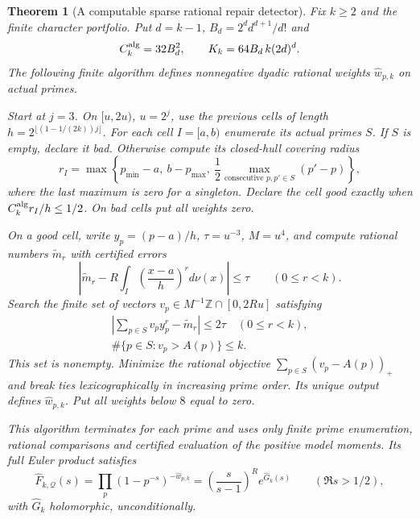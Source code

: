 \documentclass[11pt]{article}
\newtheorem{theorem}{Theorem}[section]
\theoremstyle{definition}
\begin{document}
\begin{theorem}[A computable sparse rational repair detector]
\label{thm:computable-rational-repair-detector}
Fix $k\ge2$ and the finite character portfolio. Put
$d=k-1$, $B_d=2^d d^{d+1}/d!$ and
\[
 C_k^{\rm alg}=32B_d^2,\qquad
 K_k=64B_d\,k(2d)^d.
\]
The following finite algorithm defines nonnegative dyadic rational
weights $\widehat w_{p,k}$ on actual primes.

Start at $j=3$. On $[u,2u)$, $u=2^j$, use the previous cells
of length $h=2^{\lfloor(1-1/(2k))j\rfloor}$. For each cell
$I=[a,b)$ enumerate its actual primes $S$. If $S$ is empty,
declare it bad. Otherwise compute its closed-hull covering radius
\[
 r_I=\max\left\{p_{\min}-a,\ b-p_{\max},\
             \frac12\max_{\text{consecutive }p,p'\in S}(p'-p)\right\},
\]
where the last maximum is zero for a singleton.
Declare the cell good exactly when
$C_k^{\rm alg}r_I/h\le1/2$. On bad cells put all weights zero.

On a good cell, write $y_p=(p-a)/h$, $\tau=u^{-3}$,
$M=u^4$, and compute rational numbers $\widetilde m_r$ with
certified errors
\begin{equation}
 \left|\widetilde m_r-
       R\int_I\left(\frac{x-a}{h}\right)^r d\nu(x)\right|
                         \le\tau \qquad(0\le r<k).
 \label{eq:rational-model-target-precision}
\end{equation}
Search the finite set of vectors
$v_p\in M^{-1}\mathbb Z\cap[0,2Ru]$ satisfying
\begin{equation}
 \begin{gathered}
 \left|\sum_{p\in S}v_p y_p^r-\widetilde m_r\right|
                              \le2\tau\quad(0\le r<k),\\
 \#\{p\in S:v_p>A(p)\}\le k.
 \end{gathered}
 \label{eq:rational-model-finite-search}
\end{equation}
This set is nonempty. Minimize the rational objective
$\sum_{p\in S}(v_p-A(p))_+$ and break ties lexicographically
in increasing prime order. Its unique output defines
$\widehat w_{p,k}$. Put all weights below $8$ equal to zero.

This algorithm terminates for each prime and uses only finite
prime enumeration, rational comparisons and certified evaluation
of the positive model moments. Its full Euler product satisfies
\begin{equation}
 \widehat F_{k,\mathcal Q}(s)
   =\prod_p(1-p^{-s})^{-\widehat w_{p,k}}
   =\left(\frac{s}{s-1}\right)^R e^{\widehat G_k(s)}
                       \qquad(\Re s>1/2),
 \label{eq:rational-model-favorable-product}
\end{equation}
with $\widehat G_k$ holomorphic, unconditionally.


\end{theorem}
\end{document}
